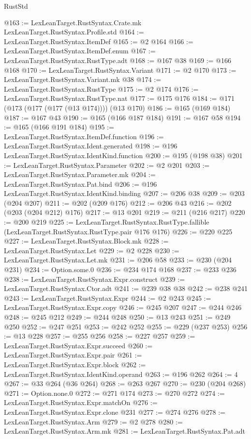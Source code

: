 \begin{lexlean}{RustStd}
\begin{coremodule}
@163 := LexLeanTarget.RustSyntax.Crate.mk LexLeanTarget.RustSyntax.Profile.std
@164 := LexLeanTarget.RustSyntax.ItemDef
@165 := @2 @164
@166 := LexLeanTarget.RustSyntax.ItemDef.enum
@167 := LexLeanTarget.RustSyntax.RustType.adt
@168 := @167 @38
@169 := @166 @168
@170 := LexLeanTarget.RustSyntax.Variant
@171 := @2 @170
@173 := LexLeanTarget.RustSyntax.Variant.mk @38
@174 := LexLeanTarget.RustSyntax.RustType
@175 := @2 @174
@176 := LexLeanTarget.RustSyntax.RustType.nat
@177 := @175 @176
@184 := @171 (@173 (@177 (@177 (@13 @174)))) (@13 @170)
@186 := @165 (@169 @184)
@187 := @167 @43
@190 := @165 (@166 @187 @184)
@191 := @167 @58
@194 := @165 (@166 @191 @184)
@195 := LexLeanTarget.RustSyntax.ItemDef.function
@196 := LexLeanTarget.RustSyntax.Ident.generated
@198 := @196 LexLeanTarget.RustSyntax.IdentKind.function
@200 := @195 (@198 @38)
@201 := LexLeanTarget.RustSyntax.Parameter
@202 := @2 @201
@203 := LexLeanTarget.RustSyntax.Parameter.mk
@204 := LexLeanTarget.RustSyntax.Pat.bind
@206 := @196 LexLeanTarget.RustSyntax.IdentKind.binding
@207 := @206 @38
@209 := @203 (@204 @207)
@211 := @202 (@209 @176)
@212 := @206 @43
@216 := @202 (@203 (@204 @212) @176)
@217 := @13 @201
@219 := @211 (@216 @217)
@220 := @200 @219
@225 := LexLeanTarget.RustSyntax.RustType.fallible
    (LexLeanTarget.RustSyntax.RustType.pair @176 @176)
@226 := @220 @225
@227 := LexLeanTarget.RustSyntax.Block.mk
@228 := LexLeanTarget.RustSyntax.Let
@229 := @2 @228
@230 := LexLeanTarget.RustSyntax.Let.mk
@231 := @206 @58
@233 := @230 (@204 @231)
@234 := Option.some.{0}
@236 := @234 @174 @168
@237 := @233 @236
@238 := LexLeanTarget.RustSyntax.Expr.construct
@239 := LexLeanTarget.RustSyntax.Ctor.adt
@241 := @239 @38 @38
@242 := @238 @241
@243 := LexLeanTarget.RustSyntax.Expr
@244 := @2 @243
@245 := LexLeanTarget.RustSyntax.Expr.copy
@246 := @245 @207
@247 := @244 @246
@248 := @245 @212
@249 := @244 @248
@250 := @13 @243
@251 := @249 @250
@252 := @247 @251
@253 := @242 @252
@255 := @229 (@237 @253)
@256 := @13 @228
@257 := @255 @256
@258 := @227 @257
@259 := LexLeanTarget.RustSyntax.Expr.succeed
@260 := LexLeanTarget.RustSyntax.Expr.pair
@261 := LexLeanTarget.RustSyntax.Expr.block
@262 := LexLeanTarget.RustSyntax.IdentKind.operand
@263 := @196 @262
@264 := 4
@267 := @33 @264 (@36 @264)
@268 := @263 @267
@270 := @230 (@204 @268)
@271 := Option.none.{0}
@272 := @271 @174
@273 := @270 @272
@274 := LexLeanTarget.RustSyntax.Expr.matchOn
@276 := LexLeanTarget.RustSyntax.Expr.clone @231
@277 := @274 @276
@278 := LexLeanTarget.RustSyntax.Arm
@279 := @2 @278
@280 := LexLeanTarget.RustSyntax.Arm.mk
@281 := LexLeanTarget.RustSyntax.Pat.adt

\end{coremodule}
\end{lexlean}

